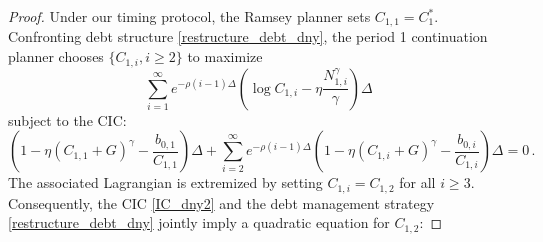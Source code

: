 \documentclass[12pt]{article}
\begin{document}

\begin{proof}
Under our timing protocol, the Ramsey planner sets $C_{1, 1}=C_{1}^*$. 
Confronting  debt structure  \eqref{restructure_debt_dny},  
the period 1 continuation planner chooses  $\{ C_{1, i}, i\geq 2\}$ to maximize %
$$	\sum_{i=1}^{\infty} e^{-\rho (i-1)\Delta} \left( \log C_{1, i}- \eta \frac{N_{1, i}^\gamma}{\gamma} \right)\Delta \, $$ 
subject to the CIC: %
\begin{equation}
	\left(1-\eta(C_{1, 1}+G)^\gamma-\frac{b_{0, 1}}{C_{1, 1}}\right)\Delta+\sum_{i=2}^\infty e^{-\rho (i-1)\Delta}\left( 1-\eta(C_{1, i}+G)^\gamma-\frac{b_{0, i}}{C_{1, i}} \right)\Delta =0 \, . \label{IC_dny2}
\end{equation}
The associated Lagrangian is 
extremized by setting  $C_{1, i}=C_{1, 2}$ for all $i\geq 3$. Consequently, the %
CIC \eqref{IC_dny2} and the debt management strategy \eqref{restructure_debt_dny} %
jointly imply a quadratic equation for $C_{1, 2}$: 

\end{proof}
\end{document}
